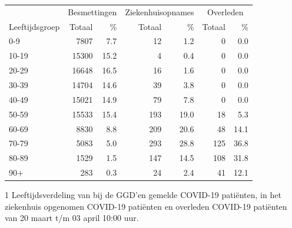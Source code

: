 \documentclass[
  english,
  man,floatsintext]{apa6}
\begin{document}
\begin{table}
\centering\begingroup\fontsize{11}{13}\selectfont

\begin{threeparttable}
\begin{tabular}{lrrrrrr}
\toprule
\multicolumn{1}{c}{ } & \multicolumn{2}{c}{Besmettingen} & \multicolumn{2}{c}{Ziekenhuisopnames} & \multicolumn{2}{c}{Overleden} \\
\cmidrule(l{3pt}r{3pt}){2-3} \cmidrule(l{3pt}r{3pt}){4-5} \cmidrule(l{3pt}r{3pt}){6-7}
Leeftijdsgroep & Totaal & \% & Totaal & \% & Totaal & \%\\
\midrule
0-9 & 7807 & 7.7 & 12 & 1.2 & 0 & 0.0\\
10-19 & 15300 & 15.2 & 4 & 0.4 & 0 & 0.0\\
20-29 & 16648 & 16.5 & 16 & 1.6 & 0 & 0.0\\
30-39 & 14704 & 14.6 & 39 & 3.8 & 0 & 0.0\\
40-49 & 15021 & 14.9 & 79 & 7.8 & 0 & 0.0\\
50-59 & 15533 & 15.4 & 193 & 19.0 & 18 & 5.3\\
60-69 & 8830 & 8.8 & 209 & 20.6 & 48 & 14.1\\
70-79 & 5083 & 5.0 & 293 & 28.8 & 125 & 36.8\\
80-89 & 1529 & 1.5 & 147 & 14.5 & 108 & 31.8\\
90+ & 283 & 0.3 & 24 & 2.4 & 41 & 12.1\\
\bottomrule
\end{tabular}
\begin{tablenotes}
\item[1] Leeftijdsverdeling van bij de GGD’en gemelde COVID-19 patiënten, in het ziekenhuis opgenomen COVID-19 patiënten en overleden COVID-19 patiënten van 20 maart t/m 03 april 10:00 uur.
\end{tablenotes}
\end{threeparttable}
\endgroup{}
\end{table}

\newpage
\end{document}
